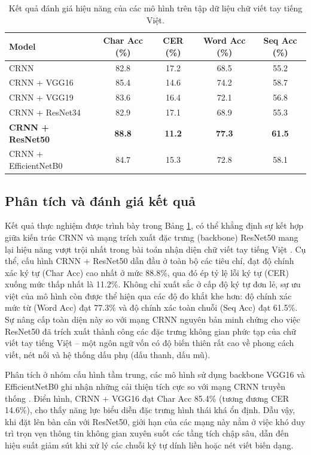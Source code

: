 \begin{table}[h]
    \centering
    \begin{tabular}{lcccc}
        \toprule
        \textbf{Model} & \textbf{Char Acc (\%)} & \textbf{CER (\%)} & \textbf{Word Acc (\%)} & \textbf{Seq Acc (\%)} \\
        \midrule
        CRNN                    & 82.8 & 17.2 & 68.5 & 55.2 \\
        CRNN + VGG16            & 85.4 & 14.6 & 74.2 & 58.7 \\
        CRNN + VGG19            & 83.6 & 16.4 & 72.1 & 56.8 \\
        CRNN + ResNet34         & 82.9 & 17.1 & 68.9 & 55.3 \\
        \textbf{CRNN + ResNet50} & \textbf{88.8} & \textbf{11.2} & \textbf{77.3} & \textbf{61.5} \\
        CRNN + EfficientNetB0   & 84.7 & 15.3 & 72.8 & 58.1 \\
        \bottomrule
    \end{tabular}
    \caption{Kết quả đánh giá hiệu năng của các mô hình trên tập dữ liệu chữ viết tay tiếng Việt.}
    \label{tab:model_comparison}
\end{table}

\subsection{Phân tích và đánh giá kết quả}
Kết quả thực nghiệm được trình bày trong Bảng \ref{tab:model_comparison}, có thể khẳng định sự kết hợp giữa kiến trúc CRNN và mạng trích xuất đặc trưng (backbone) ResNet50 mang lại hiệu năng vượt trội nhất trong bài toán nhận diện chữ viết tay tiếng Việt \cite{Reference23}. Cụ thể, cấu hình CRNN + ResNet50 dẫn đầu ở toàn bộ các tiêu chí, đạt độ chính xác ký tự (Char Acc) cao nhất ở mức 88.8\%, qua đó ép tỷ lệ lỗi ký tự (CER) xuống mức thấp nhất là 11.2\%. Không chỉ xuất sắc ở cấp độ ký tự đơn lẻ, sự ưu việt của mô hình còn được thể hiện qua các độ đo khắt khe hơn: độ chính xác mức từ (Word Acc) đạt 77.3\% và độ chính xác toàn chuỗi (Seq Acc) đạt 61.5\%. Sự nâng cấp toàn diện này so với mạng CRNN nguyên bản minh chứng cho việc ResNet50 đã trích xuất thành công các đặc trưng không gian phức tạp của chữ viết tay tiếng Việt – một ngôn ngữ vốn có độ biến thiên rất cao về phong cách viết, nét nối và hệ thống dấu phụ (dấu thanh, dấu mũ).

Phân tích ở nhóm cấu hình tầm trung, các mô hình sử dụng backbone VGG16 và EfficientNetB0 ghi nhận những cải thiện tích cực so với mạng CRNN truyền thống \cite{Reference24,Reference25}. Điển hình, CRNN + VGG16 đạt Char Acc 85.4\% (tương đương CER 14.6\%), cho thấy năng lực biểu diễn đặc trưng hình thái khá ổn định. Dẫu vậy, khi đặt lên bàn cân với ResNet50, giới hạn của các mạng này nằm ở việc khó duy trì trọn vẹn thông tin không gian xuyên suốt các tầng tích chập sâu, dẫn đến hiệu suất giảm sút khi xử lý các chuỗi ký tự dính liền hoặc nét viết biến dạng.

